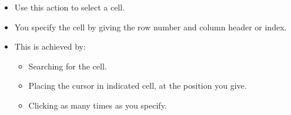 \begin{itemize}
\item Use this action to select a cell.
\item You specify the cell by giving the row number and column header or index.
\item This is achieved by:
\begin{itemize}
\item Searching for the cell.
\item Placing the cursor in indicated cell, at the position you give.
\item Clicking as many times as you specify.
\end{itemize}

\end{itemize}


